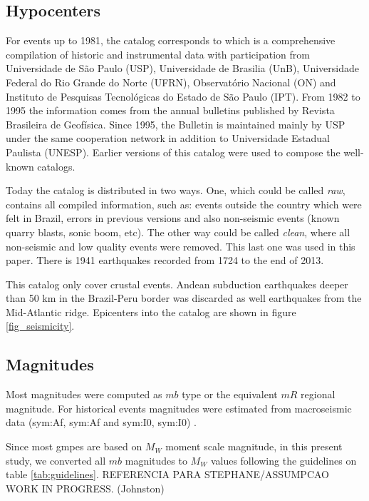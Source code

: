 \documentclass[draft, grl]{agutex}
\begin{document}
\begin{article}
\subsection{Hypocenters}

For events up to 1981, the catalog corresponds to \citet{berrocal_1984} which is a comprehensive compilation of historic and instrumental data with participation from Universidade de São Paulo (USP), Universidade de Brasilia (UnB), Universidade Federal do Rio Grande do Norte (UFRN), Observatório Nacional (ON) and Instituto de Pesquisas Tecnológicas do Estado de São Paulo (IPT). From 1982 to 1995 the information comes from the annual bulletins published by Revista Brasileira de Geofísica. Since 1995, the Bulletin is maintained mainly by USP under the same cooperation network in addition to Universidade Estadual Paulista (UNESP). Earlier versions of this catalog were used to compose the well-known \citet{ceresis_1985, ceresis_1995} catalogs.

Today the catalog is distributed in two ways. One, which could be called \emph{raw}, contains all compiled information, such as: events outside the country which were felt in Brazil, errors in previous versions and also non-seismic events (known quarry blasts, sonic boom, etc). The other way could be called \emph{clean}, where all non-seismic and low quality events were removed. This last one was used in this paper. There is 1941 earthquakes recorded from 1724 to the end of 2013.

This catalog only cover crustal events. Andean subduction earthquakes deeper than 50 km in the Brazil-Peru border was discarded as well earthquakes from the Mid-Atlantic ridge. Epicenters into the catalog are shown in figure \ref{fig_seismicity}.



\subsection{Magnitudes}

Most magnitudes were computed as $mb$ type or the equivalent $mR$ \citep{assumpcao_1983} regional magnitude. For historical events magnitudes were estimated from macroseismic data (\glsdesc{sym:Af}, \gls{sym:Af} and \glsdesc{sym:I0}, \gls{sym:I0}) \citep{berrocal_1984}. 

Since most \glspl{gmpe} are based on $M_W$ moment scale magnitude, in this present study, we converted all $mb$ magnitudes to $M_W$ values following the guidelines on table \ref{tab:guidelines}. REFERENCIA PARA STEPHANE/ASSUMPCAO WORK IN PROGRESS. (Johnston)


\end{article}
\end{document}
